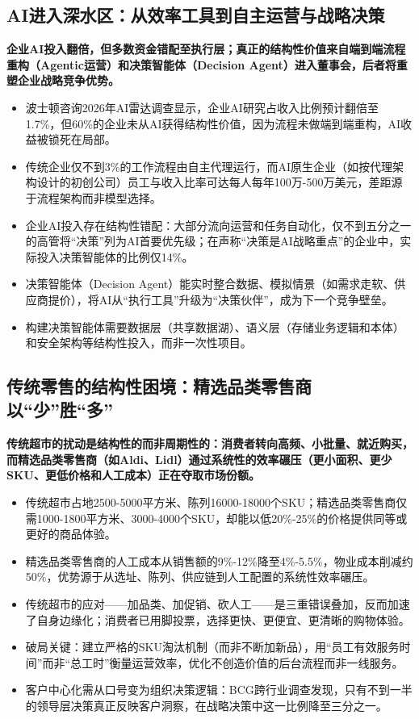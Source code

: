 \documentclass[11pt]{ctexart}
\begin{document}
\subsection{AI进入深水区：从效率工具到自主运营与战略决策}
\textbf{企业AI投入翻倍，但多数资金错配至执行层；真正的结构性价值来自端到端流程重构（Agentic运营）和决策智能体（Decision Agent）进入董事会，后者将重塑企业战略竞争优势。}
\begin{itemize}
  \item 波士顿咨询2026年AI雷达调查显示，企业AI研究占收入比例预计翻倍至1.7\%，但60\%的企业未从AI获得结构性价值，因为流程未做端到端重构，AI收益被锁死在局部。
  \item 传统企业仅不到3\%的工作流程由自主代理运行，而AI原生企业（如按代理架构设计的初创公司）员工与收入比率可达每人每年100万-500万美元，差距源于流程架构而非模型选择。
  \item 企业AI投入存在结构性错配：大部分流向运营和任务自动化，仅不到五分之一的高管将“决策”列为AI首要优先级；在声称“决策是AI战略重点”的企业中，实际投入决策智能体的比例仅14\%。
  \item 决策智能体（Decision Agent）能实时整合数据、模拟情景（如需求走软、供应商提价），将AI从“执行工具”升级为“决策伙伴”，成为下一个竞争壁垒。
  \item 构建决策智能体需要数据层（共享数据湖）、语义层（存储业务逻辑和本体）和安全架构等结构性投入，而非一次性项目。
\end{itemize}
\subsection{传统零售的结构性困境：精选品类零售商以“少”胜“多”}
\textbf{传统超市的扰动是结构性的而非周期性的：消费者转向高频、小批量、就近购买，而精选品类零售商（如Aldi、Lidl）通过系统性的效率碾压（更小面积、更少SKU、更低价格和人工成本）正在夺取市场份额。}
\begin{itemize}
  \item 传统超市占地2500-5000平方米、陈列16000-18000个SKU；精选品类零售商仅需1000-1800平方米、3000-4000个SKU，却能以低20\%-25\%的价格提供同等或更好的商品体验。
  \item 精选品类零售商的人工成本从销售额的9\%-12\%降至4\%-5.5\%，物业成本削减约50\%，优势源于从选址、陈列、供应链到人工配置的系统性效率碾压。
  \item 传统超市的应对——加品类、加促销、砍人工——是三重错误叠加，反而加速了自身边缘化；消费者已用脚投票，选择更快、更便宜、更清晰的购物体验。
  \item 破局关键：建立严格的SKU淘汰机制（而非不断加新品），用“员工有效服务时间”而非“总工时”衡量运营效率，优化不创造价值的后台流程而非一线服务。
  \item 客户中心化需从口号变为组织决策逻辑：BCG跨行业调查发现，只有不到一半的领导层决策真正反映客户洞察，在战略决策中这一比例降至三分之一。
\end{itemize}
\end{document}
